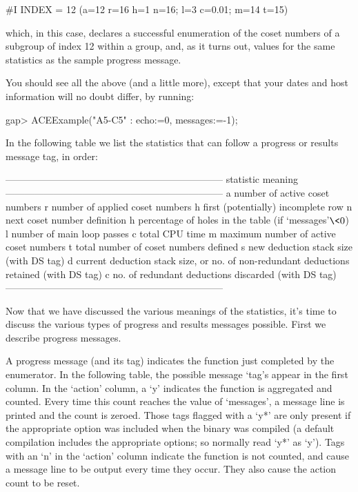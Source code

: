 \begintt
#I  INDEX = 12 (a=12 r=16 h=1 n=16; l=3 c=0.01; m=14 t=15)
\endtt

which, in this case, declares a successful enumeration  of  the  coset
numbers of a subgroup of index 12 within a group,  and,  as  it  turns
out, values for the same statistics as the sample progress message.

You should see all the above (and a little  more),  except  that  your
dates and host information will no doubt differ, by running:

\beginexample
gap> ACEExample("A5-C5" : echo:=0, messages:=-1);
\endexample

In the following table we  list  the  statistics  that  can  follow  a
progress or results message tag, in order:

\begintt
--------------------------------------------------------------------
statistic   meaning
--------------------------------------------------------------------
a           number of active coset numbers
r           number of applied coset numbers
h           first (potentially) incomplete row
n           next coset number definition
h           percentage of holes in the table (if `messages'$ \< 0$) 
l           number of main loop passes
c           total CPU time
m           maximum number of active coset numbers
t           total number of coset numbers defined
s           new deduction stack size (with DS tag)
d           current deduction stack size, or
              no. of non-redundant deductions retained (with DS tag)
c           no. of redundant deductions discarded (with DS tag)
--------------------------------------------------------------------
\endtt

Now that we have discussed the various  meanings  of  the  statistics,
it's time to  discuss  the  various  types  of  progress  and  results
messages possible. First we describe progress messages.


A progress message (and its tag) indicates the function just completed
by the enumerator. In the following table, the possible message `tag's
appear in the first column. In the `action' column,  a  `y'  indicates
the function is aggregated and counted. Every time this count  reaches
the value of `messages', a message line is printed and  the  count  is
zeroed. Those tags flagged  with  a  `y*'  are  only  present  if  the
appropriate option was included when the {\ACE} binary was compiled (a
default compilation includes the appropriate options; so normally read
`y*' as `y'). Tags with an `n' in the  `action'  column  indicate  the
function is not counted, and cause a message line to be  output  every
time they occur. They also cause the action count to be reset.

